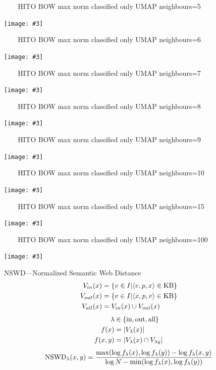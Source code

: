 \documentclass[aspectratio=1610,handout]{beamer}
\newcommand{\f}[1]{\ensuremath{f(#1)}}
\newcommand{\fl}[1]{\ensuremath{f_{\lambda}(#1)}}
\newcommand{\imageslide}[4][]
{
\begin{frame}[plain]{~~~~#2}
\vspace{0.2em}
\begin{center}
\centering\texttt{[image: \#3]}
\end{center}
#1
\note{#4}
\end{frame}
}
\begin{document}
\imageslide{HITO BOW max norm classified only UMAP neighbours=5}{img/cluster-bagofwords-classifiedonly-umap-n5-max.pdf}{}
\imageslide{HITO BOW max norm classified only UMAP neighbours=6}{img/cluster-bagofwords-classifiedonly-umap-n6-max.pdf}{}
\imageslide{HITO BOW max norm classified only UMAP neighbours=7}{img/cluster-bagofwords-classifiedonly-umap-n7-max.pdf}{}
\imageslide{HITO BOW max norm classified only UMAP neighbours=8}{img/cluster-bagofwords-classifiedonly-umap-n8-max.pdf}{}
\imageslide{HITO BOW max norm classified only UMAP neighbours=9}{img/cluster-bagofwords-classifiedonly-umap-n9-max.pdf}{}
\imageslide{HITO BOW max norm classified only UMAP neighbours=10}{img/cluster-bagofwords-classifiedonly-umap-n10-max.pdf}{}
\imageslide{HITO BOW max norm classified only UMAP neighbours=15}{img/cluster-bagofwords-classifiedonly-umap-max.pdf}{}
\imageslide{HITO BOW max norm classified only UMAP neighbours=100}{img/cluster-bagofwords-classifiedonly-umap-n100-max.pdf}{}

\begin{frame}{NSWD---Normalized Semantic Web Distance~\cite{normalizedsemanticwebdistance}}
\begin{align*}
V_{in}(x)	&= \{v \in I| \langle v,p,x \rangle \in \textnormal{KB}\}\\
V_{out}(x)	&= \{v \in I| \langle x,p,v \rangle \in \textnormal{KB}\}\\
V_{all}(x)	&= V_{in}(x) \cup V_{out}(x)
\end{align*}
\begin{align*}
\lambda		&\in \{\textnormal{in}, \textnormal{out}, \textnormal{all}\}\\
\f{x}		&= |V_{\lambda}(x)|\\
\f{x,y}	&= |V_{\lambda}(x) \cap V_{\lambda{y}}|
\end{align*}
\[
\textnormal{NSWD}_{\lambda}(x,y) = \frac{\max(\log \fl{x}, \log \fl{y})- \log \fl{x,y}}{\log N - \min(\log \fl{x}, \log \fl{y})}
\]
\end{frame}

\end{document}

